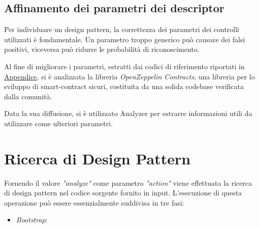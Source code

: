 \subsection{Affinamento dei parametri dei descriptor}
Per individuare un design pattern, la correttezza dei parametri dei controlli utilizzati è fondamentale. Un parametro troppo generico può causare dei falsi positivi, viceversa può ridurre le probabilità di riconoscimento.\par
Al fine di migliorare i parametri, estratti dai codici di riferimento riportati in \hyperref[appendix:codici]{Appendice}, si è analizzata la libreria \textit{OpenZeppelin Contracts}\cite{openzeppelin}, una libreria per lo sviluppo di smart-contract sicuri, costituita da una solida codebase verificata dalla comunità.\par Data la sua diffusione, si è utilizzato Analyzer per estrarre informazioni utili da utilizzare come ulteriori parametri.



\section{Ricerca di Design Pattern}
Fornendo il valore \textit{"analyze"} come parametro \textit{"action"} viene effettuata la ricerca di design pattern nel codice sorgente fornito in input. L'esecuzione di questa operazione può essere essenzialmente suddivisa in tre fasi:
\begin{itemize}
	\item \textit{Bootstrap}: 
\end{itemize}